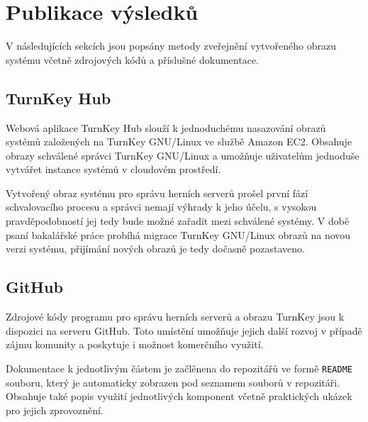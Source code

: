 \chapter{Publikace výsledků}

V následujících sekcích jsou popsány metody zveřejnění vytvořeného obrazu systému včetně zdrojových kódů
a příslušné dokumentace.

\section{TurnKey Hub}

Webová aplikace TurnKey Hub \cite{turnkey_hub} slouží k jednoduchému nasazování obrazů systémů založených na TurnKey GNU/Linux ve službě Amazon EC2.
Obsahuje obrazy schválené správci TurnKey GNU/Linux a umožňuje uživatelům jednoduše vytvářet instance systémů v cloudovém prostředí.

Vytvořený obraz systému pro správu herních serverů prošel první fází schvalovacího procesu a správci nemají výhrady k jeho účelu, s vysokou pravděpodobností
jej tedy bude možné zařadit mezi schválené systémy.
V době psaní bakalářské práce probíhá migrace TurnKey GNU/Linux obrazů na novou verzi systému, přijímání nových obrazů je tedy dočasně pozastaveno.

\section{GitHub}

Zdrojové kódy programu pro správu herních serverů \cite{github_linux_gameservers} a obrazu TurnKey \cite{github_turnkey_gameserver}
jsou k dispozici na serveru GitHub. Toto umístění umožňuje jejich další rozvoj v případě zájmu komunity a poskytuje i
možnost komerčního využití.

Dokumentace k jednotlivým částem je začlěnena do repozitářů ve formě \texttt{README} souboru, který je automaticky zobrazen
pod seznamem souborů v repozitáři. Obsahuje také popis využití jednotlivých komponent včetně praktických ukázek pro jejich zprovoznění.